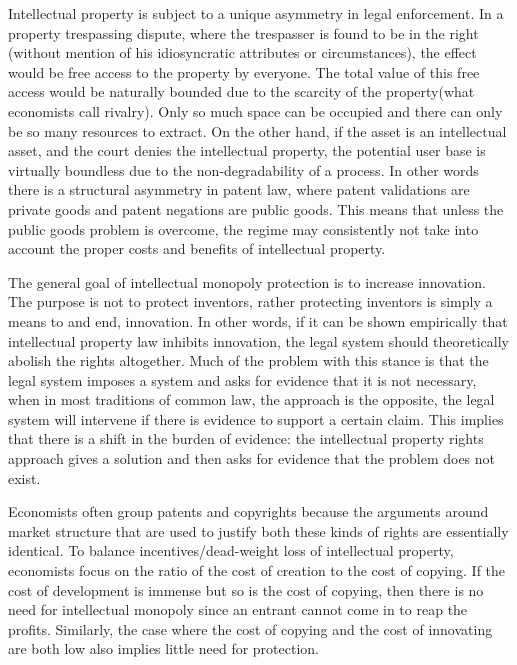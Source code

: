 Intellectual property is subject to a unique asymmetry in legal enforcement. In a property trespassing dispute, where the trespasser is found to be in the right (without mention of his idiosyncratic attributes or circumstances), the effect would be free access to the property by everyone. The total value of this free access would be naturally bounded due to the scarcity of the property(what economists call rivalry). Only so much space can be occupied and there can only be so many resources to extract. On the other hand, if the asset is an intellectual asset, and the court denies the intellectual property, the potential user base is virtually boundless due to the non-degradability of a process. In other words there is a structural asymmetry in patent law, where patent validations are private goods and patent negations are public goods. This means that unless the public goods problem is overcome, the regime may consistently not take into account the proper costs and benefits of intellectual property.

The general goal of intellectual monopoly protection is to increase innovation. The purpose is not to protect inventors, rather protecting inventors is simply a means to and end, innovation. In other words, if it can be shown empirically that intellectual property law inhibits innovation, the legal system should theoretically abolish the rights altogether. Much of the problem with this stance is that the legal system imposes a system and asks for evidence that it is not necessary, when in most traditions of common law, the approach is the opposite, the legal system will intervene if there is evidence to support a certain claim. This implies that there is a shift in the burden of evidence: the intellectual property rights approach gives a solution and then asks for evidence that the problem does not exist. 


Economists often group patents and copyrights because the arguments around market structure that are used to justify both these kinds of rights are essentially identical. To balance incentives/dead-weight loss of intellectual property, economists focus on the ratio of the cost of creation to the cost of copying. If the cost of development is immense but so is the cost of copying, then there is no need for intellectual monopoly since an entrant cannot come in to reap the profits. Similarly, the case where the cost of copying and the cost of innovating are both low also implies little need for protection. 

